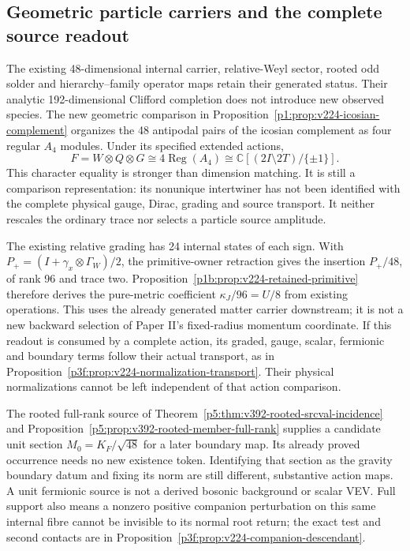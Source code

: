 \documentclass[12pt,a4paper]{article}
\begin{document}
\subsection{Geometric particle carriers and the complete source readout}
\label{p5:sec:v224-geometric-source-comparison}
The existing 48-dimensional internal carrier, relative-Weyl sector,
rooted odd solder and hierarchy--family operator maps retain their
generated status. Their analytic 192-dimensional Clifford completion
does not introduce new observed species. The new geometric comparison
in Proposition~\ref{p1:prop:v224-icosian-complement} organizes the
48 antipodal pairs of the icosian complement as four regular $A_4$
modules. Under its specified extended actions,
\[
 F=W\otimes Q\otimes G\cong4\operatorname{Reg}(A_4)
                              \cong\mathbb C[(2I\setminus2T)/\{\pm1\}].
\]
This character equality is stronger than dimension matching. It is still
a comparison representation: its nonunique intertwiner has not been
identified with the complete physical gauge, Dirac, grading and source
transport. It neither rescales the ordinary trace nor selects a particle
source amplitude.

The existing relative grading has 24 internal states of each sign.
With $P_+=(I+\gamma_x\otimes\Gamma_W)/2$, the primitive-owner
retraction gives the insertion $P_+/48$, of rank 96 and trace two.
Proposition~\ref{p1b:prop:v224-retained-primitive} therefore derives the
pure-metric coefficient $\kappa_J/96=U/8$ from existing operations.
This uses the already generated matter carrier downstream; it is not a
new backward selection of Paper II's fixed-radius momentum coordinate.
If this readout is consumed by a complete action, its graded, gauge,
scalar, fermionic and boundary terms follow their actual transport, as in
Proposition~\ref{p3f:prop:v224-normalization-transport}. Their physical
normalizations cannot be left independent of that action comparison.

The rooted full-rank source of
Theorem~\ref{p5:thm:v392-rooted-srcval-incidence} and
Proposition~\ref{p5:prop:v392-rooted-member-full-rank} supplies a
candidate unit section $M_0=K_F/\sqrt{48}$ for a later boundary map.
Its already proved occurrence needs no new existence token. Identifying
that section as the gravity boundary datum and fixing its norm are still
different, substantive action maps. A unit fermionic source is not a
derived bosonic background or scalar VEV. Full support also means a
nonzero positive companion perturbation on this same internal fibre
cannot be invisible to its normal root return; the exact test and second
contacts are in Proposition~\ref{p3f:prop:v224-companion-descendant}.
\end{document}
